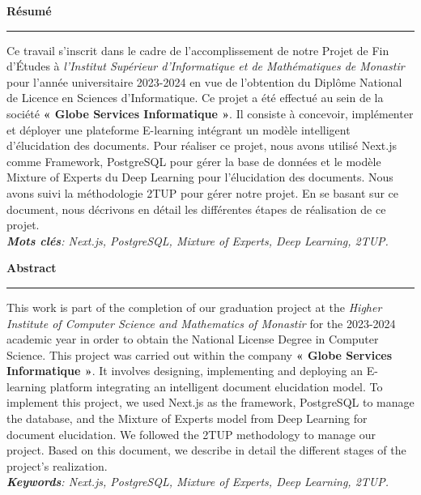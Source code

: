 \thispagestyle{empty}

\begin{center}
  \textbf{\Huge Résumé}
\end{center}
\noindent\rule{\textwidth}{0.1pt}
Ce travail s’inscrit dans le cadre de l’accomplissement de notre Projet de Fin d’Études à \textit{l’Institut Supérieur d'Informatique et de Mathématiques de Monastir} pour l’année universitaire 2023-2024 en vue de l'obtention du Diplôme National de Licence en Sciences d’Informatique. Ce projet a été effectué au sein de la société \textbf{« Globe Services Informatique »}. Il consiste à concevoir, implémenter et déployer une plateforme E-learning intégrant un modèle intelligent d’élucidation des documents. Pour réaliser ce projet, nous avons utilisé Next.js comme Framework, PostgreSQL pour gérer la base de données et le modèle Mixture of Experts du Deep Learning pour l’élucidation des documents. Nous avons suivi la méthodologie 2TUP pour gérer notre projet. En se basant sur ce document, nous décrivons en détail les différentes étapes de réalisation de ce projet.\\
\textit{\textbf{Mots clés}: Next.js, PostgreSQL, Mixture of Experts, Deep Learning, 2TUP.}

\vspace{5em}

\begin{center}
    \textbf{\Huge Abstract}
\end{center}
\noindent\rule{\textwidth}{0.1pt}
This work is part of the completion of our graduation project at the \textit{Higher Institute of Computer Science and Mathematics of Monastir} for the 2023-2024 academic year in order to obtain the National License Degree in Computer Science. This project was carried out within the company \textbf{« Globe Services Informatique »}. It involves designing, implementing and deploying an E-learning platform integrating an intelligent document elucidation model. To implement  this project, we used Next.js as the framework, PostgreSQL to manage the database, and the Mixture of Experts model from Deep Learning for document elucidation. We followed the 2TUP methodology to manage our project. Based on this document, we describe in detail the different stages of the project's realization.\\
\textit{\textbf{Keywords}: Next.js, PostgreSQL, Mixture of Experts, Deep Learning, 2TUP.}
